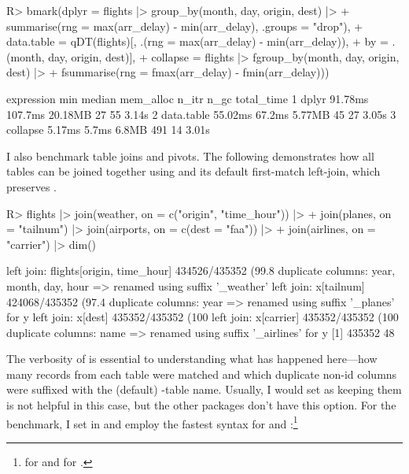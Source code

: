 \documentclass[article]{jss} %
\newcommand{\fct}[1]{\code{#1()}}
\begin{document}
%
\begin{Schunk}
\begin{Sinput}
R> bmark(dplyr = flights |> group_by(month, day, origin, dest) |>
+      summarise(rng = max(arr_delay) - min(arr_delay), .groups = "drop"),
+    data.table = qDT(flights)[, .(rng = max(arr_delay) - min(arr_delay)),
+                              by = .(month, day, origin, dest)],
+    collapse = flights |> fgroup_by(month, day, origin, dest) |>
+      fsummarise(rng = fmax(arr_delay) - fmin(arr_delay)))
\end{Sinput}
\begin{Soutput}
  expression     min  median mem_alloc n_itr n_gc total_time
1      dplyr 91.78ms 107.7ms   20.18MB    27   55      3.14s
2 data.table 55.02ms  67.2ms    5.77MB    45   27      3.05s
3   collapse  5.17ms   5.7ms     6.8MB   491   14      3.01s
\end{Soutput}
\end{Schunk}
%
I also benchmark table joins and pivots. The following demonstrates how all tables can be joined together using  and its default first-match left-join, which preserves .
%
\begin{Code}
R> flights |> join(weather, on = c("origin", "time_hour")) |>
+    join(planes, on = "tailnum") |> join(airports, on = c(dest = "faa")) |>
+    join(airlines, on = "carrier") |> dim()
\end{Code}
\begin{Schunk}
\begin{Soutput}
left join: flights[origin, time_hour] 434526/435352 (99.8%) <21.94:1st> weat
duplicate columns: year, month, day, hour => renamed using suffix '_weather'
left join: x[tailnum] 424068/435352 (97.4%) <87.62:1st> planes[tailnum] 4840
duplicate columns: year => renamed using suffix '_planes' for y
left join: x[dest] 435352/435352 (100%) <3689.42:1st> airports[faa] 118/1255
left join: x[carrier] 435352/435352 (100%) <31096.57:1st> airlines[carrier]
duplicate columns: name => renamed using suffix '_airlines' for y
[1] 435352     48
\end{Soutput}
\end{Schunk}
%
The verbosity of \fct{join} is essential to understanding what has happened here---how many records from each table were matched and which duplicate non-id columns were suffixed with the (default) -table name. Usually, I would set  as keeping them is not helpful in this case, but the other packages don't have this option. For the benchmark, I set  in  and employ the fastest syntax for  and :\footnote{ for  and  for .}
\end{document}
